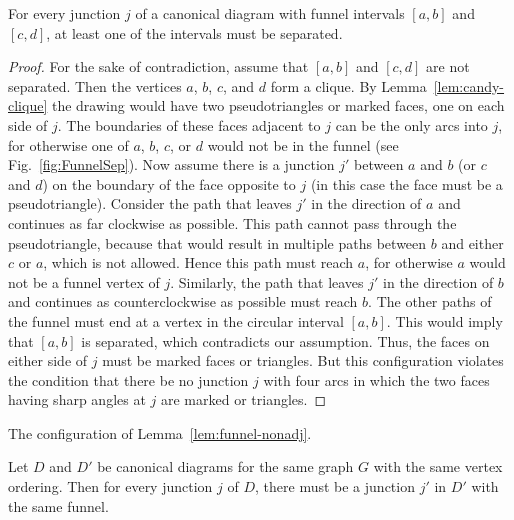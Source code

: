 \documentclass{llncs}
\begin{document}
\begin{lemma}
\label{lem:funnel-nonadj}
For every junction $j$ of a canonical diagram with funnel intervals $[a,b]$ and $[c,d]$, at least one of the intervals must be separated.
\end{lemma}
\begin{proof}
For the sake of contradiction, assume that $[a,b]$ and $[c,d]$ are not separated. Then the vertices $a$, $b$, $c$, and $d$ form a clique. By Lemma~\ref{lem:candy-clique} the drawing
would have two pseudotriangles or marked faces, one on each side of $j$.
The boundaries of these faces adjacent to $j$ can be the only arcs into $j$, for otherwise one of $a$, $b$, $c$, or $d$ would not be in the funnel (see Fig.~\ref{fig:FunnelSep}). Now assume there is a junction $j'$ between $a$ and $b$ (or $c$ and $d$) on the boundary of the face opposite to $j$ (in this case the face must be a pseudotriangle). Consider the path that leaves $j'$ in the direction of $a$ and continues as far clockwise as possible. This path cannot pass through the pseudotriangle, because that would result in multiple paths between $b$ and either $c$ or $a$, which is not allowed. Hence this path must reach $a$, for otherwise $a$ would not be a funnel vertex of $j$. Similarly, the path that leaves $j'$ in the direction of $b$ and continues as counterclockwise as possible must reach $b$. The other paths of the funnel must end at a vertex in the circular interval $[a,b]$. This would imply that $[a,b]$ is separated, which contradicts our assumption. Thus, the faces on either side of $j$ must be marked faces or triangles. But this configuration violates the condition that there be no junction $j$ with four arcs in which the two faces having sharp angles at $j$ are marked or triangles.
\end{proof}

 {The configuration of Lemma~\ref{lem:funnel-nonadj}.}

\begin{lemma}
\label{lem:candy-same-junctions}
Let $D$ and $D'$ be canonical diagrams for the same graph $G$ with the same vertex ordering.
Then for every junction $j$ of $D$, there must be a junction $j'$ in $D'$ with the same funnel.
\end{lemma}
\end{document}

